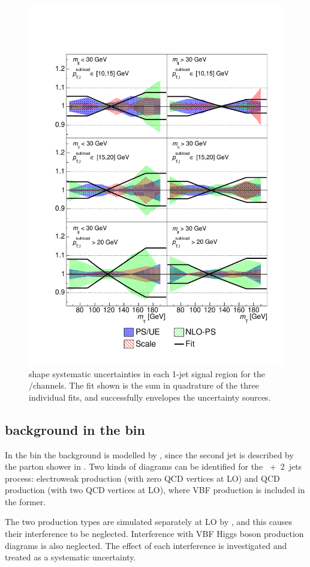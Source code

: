 \begin{figure}
	\includegraphics[width=\hugefigwidth]{tex/ww/mTshape_df_1j}
	\caption{\WW \mt shape systematic uncertainties in each 1-jet signal region for the 
	\emch/\mech channels. The fit shown is the sum in quadrature of the three individual 
	fits, and successfully envelopes the uncertainty sources.}
	\label{fig:ww_bkg:mTshape_1j}
\end{figure}



\subsection{\WW background in the \twojet bin}
\label{sec:ww_bkg:2j}

In the \twojet bin the \WW background is modelled by \sherpa, since the second jet 
is described by the parton shower in . Two kinds of diagrams 
can be identified for the \WW~+~2~jets process: electroweak production (with zero QCD 
vertices at LO) and QCD production (with two QCD vertices at LO), where VBF \WW 
production is included in the former. 

The two production types are simulated separately at LO by \sherpa, and this causes their 
interference to be neglected. Interference with VBF Higgs boson production diagrams is 
also neglected. The effect of each interference is investigated and treated as a 
systematic uncertainty.

